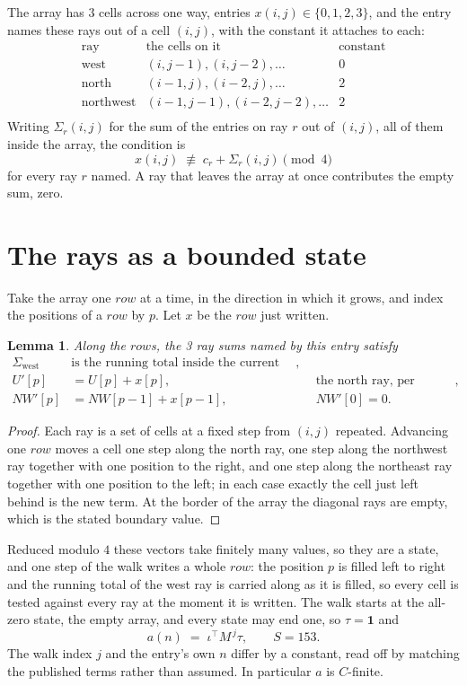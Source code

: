 \documentclass[11pt,a4paper]{article}
\theoremstyle{plain}
\newtheorem{lemma}[theorem]{Lemma}
\theoremstyle{definition}
\begin{document}
The array has $3$ cells across one way, entries $x(i,j)\in\{0,1,2,3\}$, and the entry names these
rays out of a cell $(i,j)$, with the constant it attaches to each:
\[
\begin{array}{lll}
\text{ray} & \text{the cells on it} & \text{constant} \\[2pt]
\text{west} & (i,j-1),(i,j-2),\dots & 0 \\
\text{north} & (i-1,j),(i-2,j),\dots & 2 \\
\text{northwest} & (i-1,j-1),(i-2,j-2),\dots & 2 \\
\end{array}
\]
Writing $\Sigma_r(i,j)$ for the sum of the entries on ray $r$ out of $(i,j)$, all of them
inside the array, the condition is
\[
x(i,j)\;\not\equiv\;c_r+\Sigma_r(i,j) \pmod{4}
\]
for every ray $r$ named. A ray that leaves the array at once contributes the empty sum,
zero.

\section{The rays as a bounded state}

Take the array one $row$ at a time, in the direction in which it grows, and index the
positions of a $row $ by $p$. Let $x$ be the $row$ just written.

\begin{lemma}\label{lem:rays}
Along the $row$s, the 3 ray sums named by this entry satisfy
\[
\begin{aligned}
\Sigma_{\mathrm{west}}\ &\text{is the running total inside the current row},\\
U'[p]&=U[p]+x[p], &&\text{the north ray, per position},\\
NW'[p]&=NW[p-1]+x[p-1], && NW'[0]=0 .
\end{aligned}
\]
\end{lemma}

\begin{proof}
Each ray is a set of cells at a fixed step from $(i,j)$ repeated. Advancing one $row$
moves a cell one step along the north ray, one step along the northwest ray together with one
position to the right, and one step along the northeast ray together with one position to the
left; in each case exactly the cell just left behind is the new term. At the border of the
array the diagonal rays are empty, which is the stated boundary value.
\end{proof}

Reduced modulo $4$ these vectors take finitely many values, so they are a state, and one step
of the walk writes a whole $row$: the position $p$ is filled left to right and the
running total of the west ray is carried along as it is filled, so every cell is tested
against every ray at the moment it is written. The walk starts at the all-zero state, the empty
array, and every state may end one, so $\tau=\mathbf{1}$ and
\[
a(n)\;=\;\iota^{\!\top}M^{\,j}\tau ,\qquad S=153.
\]
The walk index $j$ and the entry's own $n$ differ by a constant, read off by matching the
published terms rather than assumed. In particular $a$ is $C$-finite.
\end{document}
